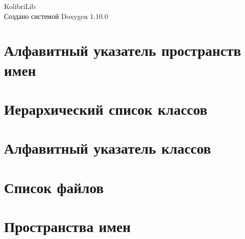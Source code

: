 \documentclass[twoside]{book}
\newcommand{\+}{\discretionary{\mbox{\scriptsize$\hookleftarrow$}}{}{}}
\newcommand{\clearemptydoublepage}{%
    \newpage{\pagestyle{empty}\cleardoublepage}%
  }
\begin{document}
  \raggedbottom
    \hypersetup{pageanchor=false,
                bookmarksnumbered=true,
                pdfencoding=unicode
               }
  \begin{titlepage}
  \vspace*{7cm}
  \begin{center}%
  {\Large Kolibri\+Lib}\\
  \vspace*{1cm}
  {\large Создано системой Doxygen 1.10.0}\\
  \end{center}
  \end{titlepage}
  \clearemptydoublepage
  \tableofcontents
  \clearemptydoublepage
  \hypersetup{pageanchor=true}


\chapter{Алфавитный указатель пространств имен}

\chapter{Иерархический список классов}

\chapter{Алфавитный указатель классов}

\chapter{Список файлов}

\chapter{Пространства имен}















\end{document}
